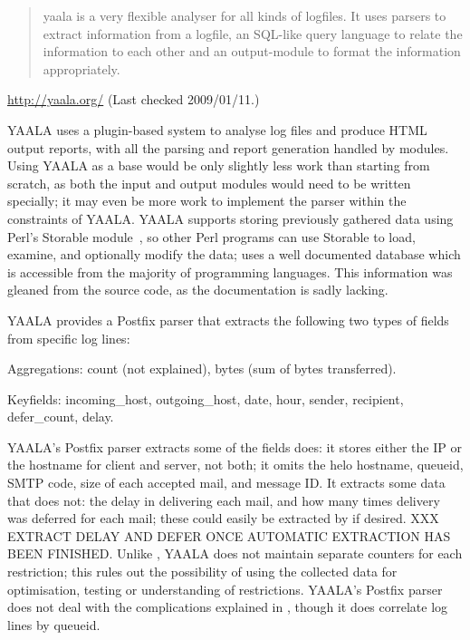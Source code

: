 \begin{quotation}

    yaala is a very flexible analyser for all kinds of logfiles. It uses
    parsers to extract information from a logfile, an SQL-like query
    language to relate the information to each other and an output-module
    to format the information appropriately.

\end{quotation}

\noindent{}\url{http://yaala.org/} \newline{}
(Last checked 2009/01/11.)

YAALA uses a plugin-based system to analyse log files and produce HTML
output reports, with all the parsing and report generation handled by
modules.  Using YAALA as a base would be only slightly less work than
starting from scratch, as both the input and output modules would need to
be written specially; it may even be more work to implement the parser
within the constraints of YAALA\@.  YAALA supports storing previously
gathered data using Perl's Storable module~\cite{perl-storable}, so other
Perl programs can use Storable to load, examine, and optionally modify the
data; \parsername{} uses a well documented database which is accessible
from the majority of programming languages.  This information was gleaned
from the source code, as the documentation is sadly lacking.

YAALA provides a Postfix parser that extracts the following two types of
fields from specific log lines:

\begin{eqlist}

    \item [Aggregations:] count (not explained), bytes (sum of bytes
        transferred).

    \item [Keyfields:] incoming\_host, outgoing\_host, date, hour, sender,
        recipient, defer\_count, delay.

\end{eqlist}

\noindent{}YAALA's Postfix parser extracts some of the fields \parsername{}
does: it stores either the \gls{IP} or the hostname for client and server,
not both; it omits the helo hostname, queueid, \gls{SMTP} code, size of
each accepted mail, and message ID\@.  It extracts some data that
\parsername{} does not: the delay in delivering each mail, and how many
times delivery was deferred for each mail; these could easily be extracted
by \parsername{} if desired.  XXX EXTRACT DELAY AND DEFER ONCE AUTOMATIC
EXTRACTION HAS BEEN FINISHED\@.  Unlike \parsername{}, YAALA does not
maintain separate counters for each restriction; this rules out the
possibility of using the collected data for optimisation, testing or
understanding of restrictions.  YAALA's Postfix parser does not deal with
the complications explained in , though it does
correlate log lines by queueid.

